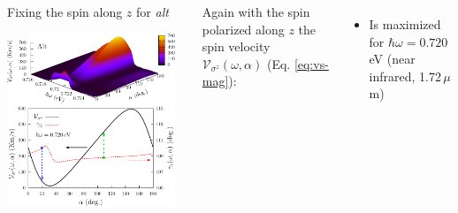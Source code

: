 \documentclass{beamer}
\begin{document}


\begin{frame}

\begin{columns}


\begin{center}

Fixing the spin along $z$ for \emph{alt}

\vspace{2mm}

\includegraphics[width=0.95\textwidth]{figs/fig6.pdf}

\end{center}  



{ Again with the spin polarized along $z$ the spin velocity
$\mathcal{V}_{\sigma^{z}}(\omega,\alpha)$ (Eq. \ref{eq:vs-mag}):}


\vspace{-2mm}

{\small

\begin{itemize}

\item 
Is maximized for $\hbar \omega = 0.720$\,eV (near infrared, 1.72\,$\mu$m)


\end{itemize}}
\end{columns}
\end{frame}
\end{document}

